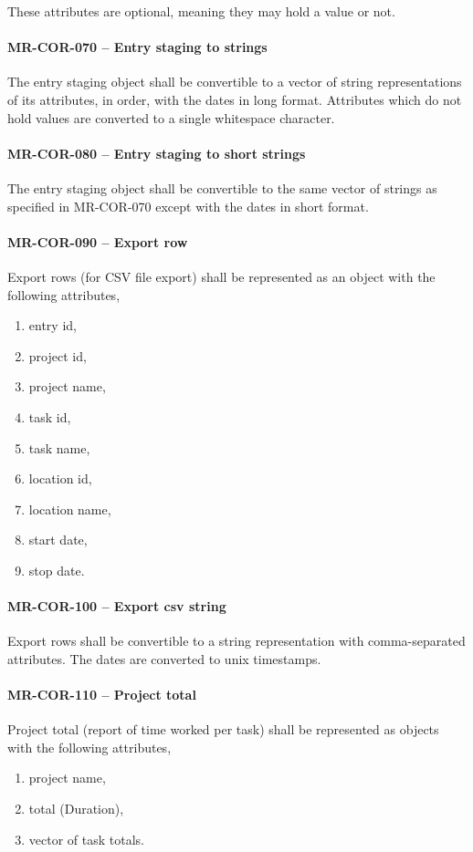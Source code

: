 These attributes are optional, meaning they may hold a value or not.

\paragraph{MR-COR-070 -- Entry staging to strings}
The entry staging object shall be convertible to a vector of string
representations of its attributes, in order, with the dates in
long format. Attributes which do not hold values are converted to a
single whitespace character.

\paragraph{MR-COR-080 -- Entry staging to short strings}
The entry staging object shall be convertible to the same vector
of strings as specified in MR-COR-070 except with the dates in short
format.

\paragraph{MR-COR-090 -- Export row}
Export rows (for CSV file export) shall be represented as an object
with the following attributes,
\begin{enumerate}
\item entry id,
\item project id,
\item project name,
\item task id,
\item task name,
\item location id,
\item location name,
\item start date,
\item stop date.
\end{enumerate}

\paragraph{MR-COR-100 -- Export csv string}
Export rows shall be convertible to a string representation with
comma-separated attributes. The dates are converted to unix timestamps.

\paragraph{MR-COR-110 -- Project total}
Project total (report of time worked per task) shall be represented
as objects with the following attributes,
\begin{enumerate}
\item project name,
\item total (Duration),
\item vector of task totals.
\end{enumerate}

